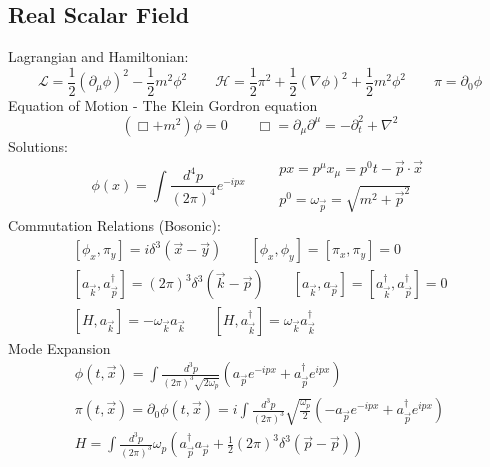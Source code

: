 \documentclass{article}
\begin{document}
\subsection{Real Scalar Field}
Lagrangian and Hamiltonian:
\begin{equation*}
    \mathcal{L} = \frac{1}{2}\left(\partial_\mu\phi\right)^2 - \frac{1}{2}m^2\phi^2
    \qquad
    \mathcal{H} = \frac{1}{2} \pi^2 + \frac{1}{2}\left(\nabla \phi\right)^2 + \frac{1}{2}m^2\phi^2
    \qquad
    \pi = \partial_0 \phi
\end{equation*}
Equation of Motion - The Klein Gordron equation
\begin{equation*}
    \left(\Box + m^2\right)\phi = 0
    \qquad
    \Box = \partial_\mu \partial^\mu = - \partial_t^2 + \nabla^2
\end{equation*}
Solutions:
\begin{equation*}
    \phi(x) = \int \frac{d^4p}{(2\pi)^4}e^{-ipx}
    \qquad
    \begin{matrix}
        px = p^\mu x_\mu = p^0t - \vec{p}\cdot\vec{x}
        \\
        p^0 = \omega_{\vec{p}} = \sqrt{m^2 + \vec{p}^2}
    \end{matrix}
\end{equation*}
Commutation Relations (Bosonic):
\begin{equation*}
\begin{gathered}
    \left[\phi_x, \pi_y\right] = i\delta^3(\vec{x} - \vec{y})
    \qquad
    \left[\phi_x, \phi_y\right] =
    \left[\pi_x, \pi_y\right] = 0
    \\
    \left[a_{\vec{k}}, a^\dagger_{\vec{p}}\right] = \left(2\pi\right)^3\delta^3(\vec{k} - \vec{p})
    \qquad
    \left[a_{\vec{k}}, a_{\vec{p}}\right] =
    \left[a^\dagger_{\vec{k}}, a^\dagger_{\vec{p}}\right] = 0
    \\
    \left[H, a_{\vec{k}}\right] = -\omega_{\vec{k}}a_{\vec{k}}
    \qquad
    \left[H, a^\dagger_{\vec{k}}\right] = \omega_{\vec{k}}a^\dagger_{\vec{k}}
\end{gathered}
\end{equation*}
Mode Expansion
\begin{equation*}
\begin{gathered}
    \phi(t, \vec{x}) = \int \frac{d^3p}{(2\pi)^3\sqrt{2\omega_p}}\left(
        a_{\vec{p}}e^{-ipx} + a^\dagger_{\vec{p}}e^{ipx}
    \right)
    \\
    \pi(t, \vec{x}) = \partial_0 \phi(t, \vec{x}) = i\int \frac{d^3p}{(2\pi)^3}\sqrt{\frac{\omega_p}{2}}\left(
        -a_{\vec{p}}e^{-ipx} + a^\dagger_{\vec{p}}e^{ipx}
    \right)
    \\
    H = \int \frac{d^3p}{(2\pi)^3}\omega_p\left(
        a^\dagger_{\vec{p}}a_{\vec{p}}
        + \frac{1}{2} \left(2\pi\right)^3 \delta^3(\vec{p} - \vec{p})
    \right)
\end{gathered}
\end{equation*}
\end{document}

